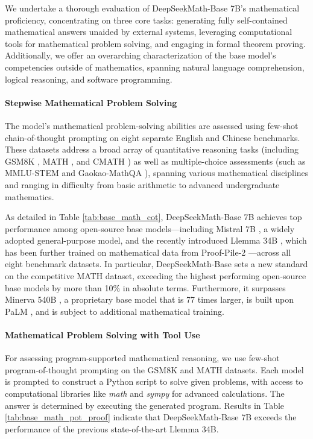 We undertake a thorough evaluation of DeepSeekMath-Base 7B’s mathematical proficiency, concentrating on three core tasks: generating fully self-contained mathematical answers unaided by external systems, leveraging computational tools for mathematical problem solving, and engaging in formal theorem proving. Additionally, we offer an overarching characterization of the base model's competencies outside of mathematics, spanning natural language comprehension, logical reasoning, and software programming.

\paragraph{Stepwise Mathematical Problem Solving}

The model’s mathematical problem-solving abilities are assessed using few-shot chain-of-thought prompting \citep{cot} on eight separate English and Chinese benchmarks. These datasets address a broad array of quantitative reasoning tasks (including GSM8K \citep{gsm8k}, MATH \citep{MATH}, and CMATH \citep{wei2023cmath}) as well as multiple-choice assessments (such as MMLU-STEM \citep{mmlu} and Gaokao-MathQA \citep{agieval}), spanning various mathematical disciplines and ranging in difficulty from basic arithmetic to advanced undergraduate mathematics.

As detailed in Table \ref{tab:base_math_cot}, DeepSeekMath-Base 7B achieves top performance among open-source base models—including Mistral 7B \citep{mistral}, a widely adopted general-purpose model, and the recently introduced Llemma 34B \citep{llemma}, which has been further trained on mathematical data from Proof-Pile-2 \citep{llemma}—across all eight benchmark datasets. In particular, DeepSeekMath-Base sets a new standard on the competitive MATH dataset, exceeding the highest performing open-source base models by more than 10\% in absolute terms. Furthermore, it surpasses Minerva 540B \citep{minerva}, a proprietary base model that is 77 times larger, is built upon PaLM \citep{palm}, and is subject to additional mathematical training.

\paragraph{Mathematical Problem Solving with Tool Use} For assessing program-supported mathematical reasoning, we use few-shot program-of-thought prompting \citep{pot,pal} on the GSM8K and MATH datasets. Each model is prompted to construct a Python script to solve given problems, with access to computational libraries like \textit{math} and \textit{sympy} for advanced calculations. The answer is determined by executing the generated program. Results in Table \ref{tab:base_math_pot_proof} indicate that DeepSeekMath-Base 7B exceeds the performance of the previous state-of-the-art Llemma 34B.

